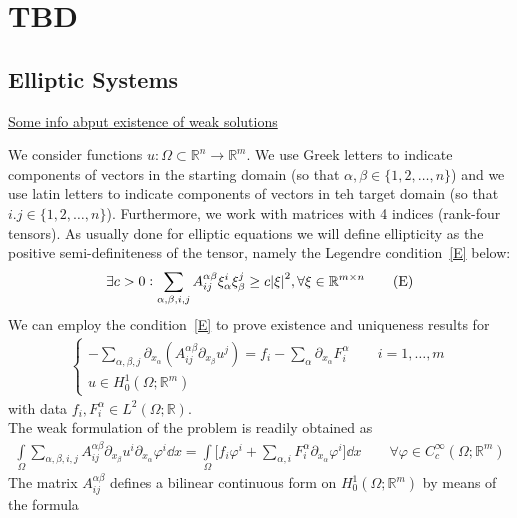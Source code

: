 \chapter{TBD}

\section{Elliptic Systems}
\underline{Some info abput existence of weak solutions}

We consider functions \(u: \Omega \subset \mathbb{R}^{n} \to \mathbb{R}^{m}\). We use Greek letters to indicate components of vectors in the starting domain (so that \(\alpha,\beta \in \{1,2,\dots,n\} \)) and we use latin letters to indicate components of vectors in teh target domain (so that \(i.j \in \{1,2,\dots,n\} \)). Furthermore, we work with matrices with 4 indices (rank-four tensors). As usually done for elliptic equations we will define ellipticity as the positive semi-definiteness of the tensor, namely the Legendre condition~\eqref{E} below:
\begin{gather}
	\exists c > 0 : \sum_{\alpha,\beta,i,j} A_{ij}^{\alpha\beta} \xi_{\alpha}^{i} \xi_{\beta}^{j} \geq c \abs{\xi}^{2}, \forall \xi \in \mathbb{R}^{m \times n} \tag{E}\label{E}
\end{gather}
We can employ the condition~\eqref{E} to prove existence and uniqueness results for
\begin{gather}
	\begin{cases}
		- \sum_{\alpha, \beta, j} \partial_{x_\alpha} (A_{ij}^{\alpha \beta} \partial_{x_{\beta}} u^{j}) = f_{i} - \sum_{\alpha}^{} \partial_{x_{\alpha}} F_{i}^{\alpha}\qquad i=1,\dots,m \\
		u \in H_{0}^{1}(\Omega; \mathbb{R}^{m})
	\end{cases} \tag{LS}\label{LS}
\end{gather}
with data \(f_{i},F_{i}^{\alpha} \in L^{2}(\Omega;\mathbb{R})\).\\
The weak formulation of the problem is readily obtained as
\begin{gather}
	\int\limits_{\Omega}^{} \sum_{\alpha, \beta, i,j}^{} A_{ij}^{\alpha \beta} \partial_{x_{\beta}} u^{i} \partial_{x_{\alpha}} \varphi^{i} \dd{x} = \int\limits_{\Omega}^{} \Big[f_{i} \varphi^{i} + \sum_{\alpha,i}^{} F_{i}^{\alpha} \partial_{x_{\alpha}} \varphi^{i} \Big] \dd{x} \qquad \forall \varphi \in C_c^\infty(\Omega;\mathbb{R}^{m})
\end{gather}
The matrix \(A_{ij}^{\alpha \beta}\) defines a bilinear continuous form on \(H_0^1(\Omega;\mathbb{R}^{m})\) by means of the formula
